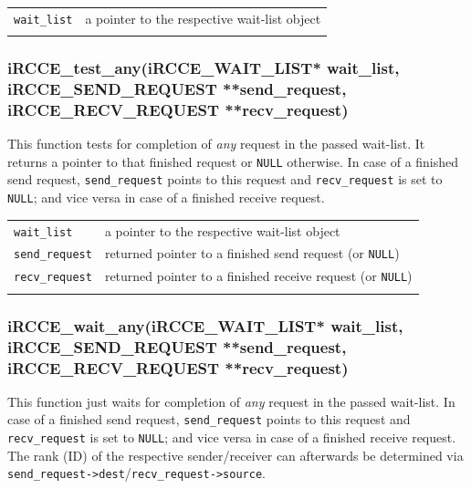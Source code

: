 \documentclass[fontsize=10pt, paper=a4, DIV12, pagesize=auto]{scrartcl}
\begin{document}
\begin{tabular}{ll}
\texttt{wait\_list} & a pointer to the respective wait-list object \\
\hspace{2.0cm}
\end{tabular}


\subsubsection{iRCCE\_test\_any(iRCCE\_WAIT\_LIST* wait\_list, iRCCE\_SEND\_REQUEST **send\_request, \\ 
\hspace{7.45cm} iRCCE\_RECV\_REQUEST **recv\_request)}\vspace{-0.3cm}
This function tests for completion of \emph{any} request in the passed wait-list.
It returns a pointer to that finished request or \texttt{NULL} otherwise.
In case of a finished send request, \texttt{send\_request} points to this request and \texttt{recv\_request} is set to \texttt{NULL}; and vice versa in case of a finished receive request.

\begin{tabular}{ll}
\texttt{wait\_list}    & a pointer to the respective wait-list object \\
\texttt{send\_request} & returned pointer to a finished send request (or \texttt{NULL}) \\
\texttt{recv\_request} & returned pointer to a finished receive request (or \texttt{NULL}) \\
\hspace{2.0cm}
\end{tabular}


\subsubsection{iRCCE\_wait\_any(iRCCE\_WAIT\_LIST* wait\_list, iRCCE\_SEND\_REQUEST **send\_request, \\ 
\hspace{7.5cm} iRCCE\_RECV\_REQUEST **recv\_request)}\vspace{-0.3cm}
This function just waits for completion of \emph{any} request in the passed wait-list.
In case of a finished send request, \texttt{send\_request} points to this request and \texttt{recv\_request} is set to \texttt{NULL}; and vice versa in case of a finished receive request.
The rank (ID) of the respective sender/receiver can afterwards be determined via \texttt{send\_request->dest}/\texttt{recv\_request->source}.
\end{document}
